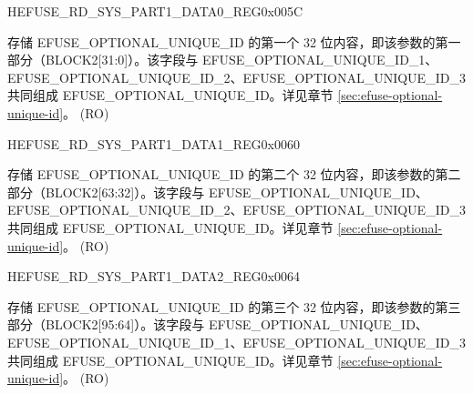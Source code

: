 \begin{register}{H}{EFUSE\_RD\_SYS\_PART1\_DATA0\_REG}{0x005C}\label{regdesc:EFUSERDSYSPART1DATA0REG}\label{regdesc:EFUSERDSYSPART1DATANREG}
%
\regnewline%
\begin{regdesc}\begin{reglist}
\label{fielddesc:EFUSEOPTIONALUNIQUEID}\item [EFUSE\_OPTIONAL\_UNIQUE\_ID] 存储 EFUSE\_OPTIONAL\_UNIQUE\_ID 的第一个 32 位内容，即该参数的第一部分（BLOCK2[31:0]）。该字段与 EFUSE\_OPTIONAL\_UNIQUE\_ID\_1、EFUSE\_OPTIONAL\_UNIQUE\_ID\_2、EFUSE\_OPTIONAL\_UNIQUE\_ID\_3 共同组成 EFUSE\_OPTIONAL\_UNIQUE\_ID。详见章节 \ref{sec:efuse-optional-unique-id}。 (RO)
\end{reglist}\end{regdesc}
\end{register}


\begin{register}{H}{EFUSE\_RD\_SYS\_PART1\_DATA1\_REG}{0x0060}\label{regdesc:EFUSERDSYSPART1DATA1REG}
%
\regnewline%
\begin{regdesc}\begin{reglist}
\label{fielddesc:EFUSEOPTIONALUNIQUEID1}\item [EFUSE\_OPTIONAL\_UNIQUE\_ID\_1] 存储 EFUSE\_OPTIONAL\_UNIQUE\_ID 的第二个 32 位内容，即该参数的第二部分（BLOCK2[63:32]）。该字段与 EFUSE\_OPTIONAL\_UNIQUE\_ID、EFUSE\_OPTIONAL\_UNIQUE\_ID\_2、EFUSE\_OPTIONAL\_UNIQUE\_ID\_3 共同组成 EFUSE\_OPTIONAL\_UNIQUE\_ID。详见章节 \ref{sec:efuse-optional-unique-id}。 (RO)
\end{reglist}\end{regdesc}
\end{register}


\begin{register}{H}{EFUSE\_RD\_SYS\_PART1\_DATA2\_REG}{0x0064}\label{regdesc:EFUSERDSYSPART1DATA2REG}
%
\regnewline%
\begin{regdesc}\begin{reglist}
\label{fielddesc:EFUSEOPTIONALUNIQUEID2}\item [EFUSE\_OPTIONAL\_UNIQUE\_ID\_2] 存储 EFUSE\_OPTIONAL\_UNIQUE\_ID 的第三个 32 位内容，即该参数的第三部分（BLOCK2[95:64]）。该字段与 EFUSE\_OPTIONAL\_UNIQUE\_ID、EFUSE\_OPTIONAL\_UNIQUE\_ID\_1、EFUSE\_OPTIONAL\_UNIQUE\_ID\_3 共同组成 EFUSE\_OPTIONAL\_UNIQUE\_ID。详见章节 \ref{sec:efuse-optional-unique-id}。 (RO)
\end{reglist}\end{regdesc}
\end{register}


